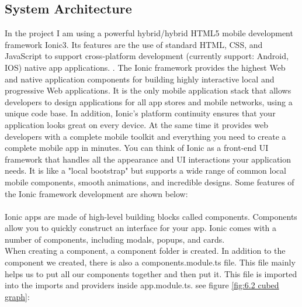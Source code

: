 \subsection{System Architecture}
In the project I am using a powerful hybrid/hybrid HTML5 mobile development framework Ionic3. Its features are the use of standard HTML, CSS, and JavaScript to support cross-platform development (currently support: Android, IOS) native app applications. . The Ionic framework provides the highest Web and native application components for building highly interactive local and progressive Web applications. It is the only mobile application stack that allows developers to design applications for all app stores and mobile networks, using a unique code base. In addition, Ionic's platform continuity ensures that your application looks great on every device. At the same time it provides web developers with a complete mobile toolkit and everything you need to create a complete mobile app in minutes. You can think of Ionic as a front-end UI framework that handles all the appearance and UI interactions your application needs. It is like a "local bootstrap" but supports a wide range of common local mobile components, smooth animations, and incredible designs. Some features of the Ionic framework development are shown below: \\ \\ 
Ionic apps are made of high-level building blocks called components. Components allow you to quickly construct an interface for your app. Ionic comes with a number of components, including modals, popups, and cards.  \\ When creating a component, a component folder is created. In addition to the component we created, there is also a components.module.ts file. This file mainly helps us to put all our components together and then put it. This file is imported into the imports and providers inside app.module.ts. see figure \ref{fig:6.2 cubed graph}:
